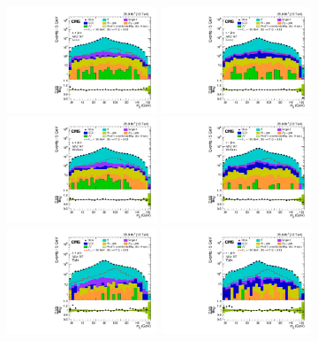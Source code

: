 \begin{figure}
\centering
{\includegraphics[width=0.4\textwidth]{Figure_003-a.pdf}}
{\includegraphics[width=0.4\textwidth]{Figure_003-b.pdf}}
{\includegraphics[width=0.4\textwidth]{Figure_003-c.pdf}}
{\includegraphics[width=0.4\textwidth]{Figure_003-d.pdf}}
{\includegraphics[width=0.4\textwidth]{Figure_003-e.pdf}}
{\includegraphics[width=0.4\textwidth]{Figure_003-f.pdf}}

\end{figure}
